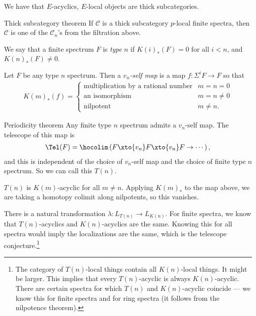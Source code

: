 \begin{example} We have that $E$-acyclics, $E$-local objects are thick subcategories.
\end{example}

\begin{customenvironment}{Thick subcategory theorem} If $\mathscr{C}$ is a thick subcategory $p$-local finite spectra, then $\mathscr{C}$ is one of the $\mathscr{C}_n$'s from the filtration above.
\end{customenvironment}

We say that a finite spectrum $F$ is \textit{type} $n$ if $K(i)_\ast(F) = 0$ for all $i<n$, and $K(n)_\ast(F) \ne 0$.

Let $F$ be any type $n$ spectrum. Then a $v_n$\textit{-self map} is a map $f: \Sigma^i F \to F$ so that
\begin{align*}
    K(m)_\ast(f) = \begin{cases} \text{multiplication by a rational number} & m=n=0 \\ \text{an isomorphism} & m=n\ne 0 \\ \text{nilpotent} & m\ne n. \end{cases}
\end{align*}

\begin{customenvironment}{Periodicity theorem} Any finite type $n$ spectrum admits a $v_n$-self map. The telescope of this map is
\begin{align*}
    \Tel(F) = \hocolim \left( F \xto{v_n} F \xto{v_n} F \to \cdots \right),
\end{align*}
and this is independent of the choice of $v_n$-self map and the choice of finite type $n$ spectrum. So we can call this $T(n)$.
\end{customenvironment}

\begin{fact} $T(n)$ is $K(m)$-acyclic for all $m\ne n$. Applying $K(m)_\ast$ to the map above, we are taking a homotopy colimit along nilpotents, so this vanishes.
\end{fact}

There is a natural transformation $\lambda: L_{T(n)} \to L_{K(n)}$. For finite spectra, we know that $T(n)$-acyclics and $K(n)$-acyclics are the same. Knowing this for all spectra would imply the localizations are the same, which is the telescope conjecture.\footnote{The category of $T(n)$-local things contain all $K(n)$-local things. It might be larger. This implies that every $T(n)$-acyclic is always $K(n)$-acyclic. There are certain spectra for which $T(n)$ and $K(n)$-acyclic coincide --- we know this for finite spectra and for ring spectra (it follows from the nilpotence theorem).}
